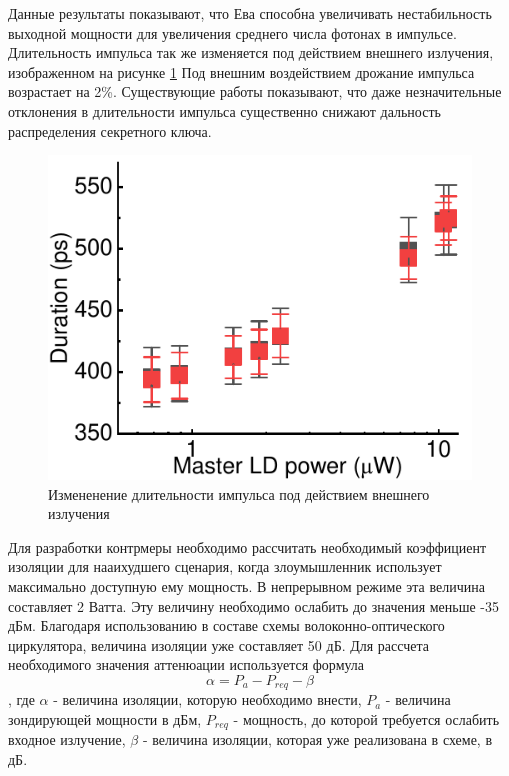 Данные результаты показывают, что Ева способна увеличивать нестабильность выходной мощности для увеличения среднего числа фотонах в импульсе. Длительность импульса так же изменяется под действием внешнего излучения, изображенном на рисунке \ref{fig:duration ref} Под внешним воздействием дрожание импульса возрастает на 2\%.  Существующие работы показывают, что даже незначительные отклонения в длительности импульса существенно снижают дальность распределения секретного ключа. 
\begin{figure}
    \centering
    \includegraphics{images/duration_change.pdf}
    \caption{Измененение длительности импульса под действием внешнего излучения}
    \label{fig:duration ref}
\end{figure}
\newline Для разработки контрмеры необходимо рассчитать необходимый коэффициент изоляции для нааихудшего сценария, когда злоумышленник использует максимально доступную ему мощность. В непрерывном режиме эта величина составляет 2 Ватта. Эту величину необходимо ослабить до значения меньше -35 дБм. Благодаря использованию в составе схемы волоконно-оптического циркулятора, величина изоляции уже составляет 50 дБ.  Для рассчета необходимого значения аттенюации используется формула
\begin{equation}
\label{eq:isolation}
    \alpha = P_a - P_{req} - \beta
\end{equation}, где $\alpha$ - величина изоляции, которую необходимо внести, $P_a$ - величина зондирующей мощности в дБм, $P_{req}$ - мощность, до которой требуется ослабить входное излучение, $\beta$ - величина изоляции, которая уже реализована в схеме, в дБ. 
